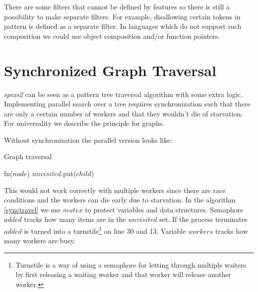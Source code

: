 There are some filters that cannot be defined by features so there is still a possibility to make separate filters. For example, disallowing certain tokens in pattern is defined as a separate filter. In languages which do not support such composition we could use object composition and/or function pointers.

\section{Synchronized Graph Traversal}

\emph{spexs2} can be seen as a pattern tree traversal algorithm with some extra logic. Implementing parallel search over a tree requires synchronization such that there are only a certain number of workers and that they wouldn't die of starvation. For universality we describe the principle for graphs.

Without synchronization the parallel version looks like:

\begin{algorithm}[H]
    \caption{Graph traversal}
\begin{algorithmic}[1]

        
        \Spawn
                \State fn($node$)
                        \State $unvisited$.put($child$)
                    \EndIf
                \EndFor
            \EndWhile
        \EndSpawn

    \EndFunction
\end{algorithmic}
\end{algorithm}

This would not work correctly with multiple workers since there are race conditions and the workers can die early due to starvation. In the algorithm \ref{synctravel} we use $mutex$ to protect variables and data structures. Semaphore $added$ tracks how many items are in the $unvisited$ set. If the process terminates $added$ is turned into a turnstile\footnote{Turnstile\cite{semaphores} is a way of using a semaphore for letting through multiple waiters by first releasing a waiting worker and that worker will release another worker.} on line 30 and 13. Variable $workers$ tracks how many workers are busy.

